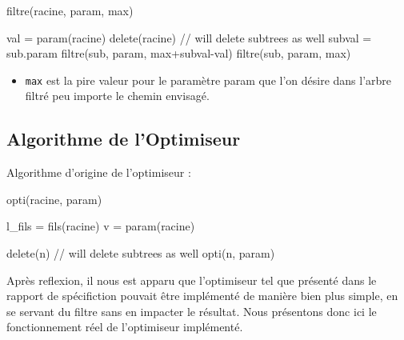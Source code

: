  	\begin{algorithm}[h!]
            \caption{filtre(racine, param, max)}
            \label{algo:filtrereal}
            \begin{algorithmic}
	\STATE val = param(racine)
	\STATE
		\STATE delete(racine) // will delete subtrees as well
		\RETURN
	\STATE
	\ELSE
				\STATE subval = sub.param
				\STATE filtre(sub, param, max+subval-val)
			\ENDFOR
		\ELSE
				\STATE filtre(sub, param, max)
			\ENDFOR
		\ENDIF
	\ENDIF
            \end{algorithmic}
        \end{algorithm}

        \begin{itemize}
            \item \verb|max| est la pire valeur pour le paramètre param que l'on désire dans l'arbre filtré peu importe le chemin envisagé.
        \end{itemize}

\subsection{Algorithme de l'Optimiseur}

Algorithme d'origine de l'optimiseur :

         \begin{algorithm}[h!]
            \caption{opti(racine, param)}
            \label{algo:opti}
            \begin{algorithmic}
                \STATE l\_fils = fils(racine)
                    \RETURN
                \ENDIF
                \STATE
                    \STATE v = param(racine)

                            \STATE delete(n) // will delete subtrees as well
                        \ENDIF
                    \ENDFOR
                \ENDIF
                \STATE
                    \STATE opti(n, param)
                \ENDFOR
            \end{algorithmic}
        \end{algorithm}

Après reflexion, il nous est apparu que l'optimiseur tel que présenté dans le rapport de spécifiction pouvait être implémenté de manière bien plus simple, en se servant du filtre sans en impacter le résultat. Nous présentons donc ici le fonctionnement réel de l'optimiseur implémenté.

